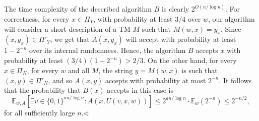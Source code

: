 \documentclass[10pt,a4paper]{article}
\begin{document}
The time complexity of the described algorithm $B$ is clearly $2^{O(n/\log n)}$. For correctness, for every $x\in\Pi_Y$, with probability at least $3/4$ over $w$, our algorithm will consider a short description of a TM $M$ such that $M(w,x)=y_x$. Since $(x,y_x)\in\Pi'_Y$, we get that $A(x,y_x)$ will accept with probability at least $1-2^{-n}$ over its internal randomness. Hence, the algorithm $B$ accepts $x$ with probability at least $(3/4)(1-2^{-n})>2/3$. On the other hand, for every $x\in\Pi_N$, for every $w$ and all $M$, the string $y=M(w,x)$ is such that $(x,y)\in\Pi'_N$, and so $A(x,y)$ accepts with probability at most $2^{-n}$. It follows that the probability that $B(x)$ accepts in this case is
\[\mathbb E_{w,A}[\exists v\in\{0,1\}^{an/\log n}:A(x,U(v,x,w))]\leq2^{an/\log n}\cdot\mathbb E_w(2^{-n})\leq2^{-n/2},\]
for all sufficiently large $n$.\hfill$\triangleleft$
\end{document}
